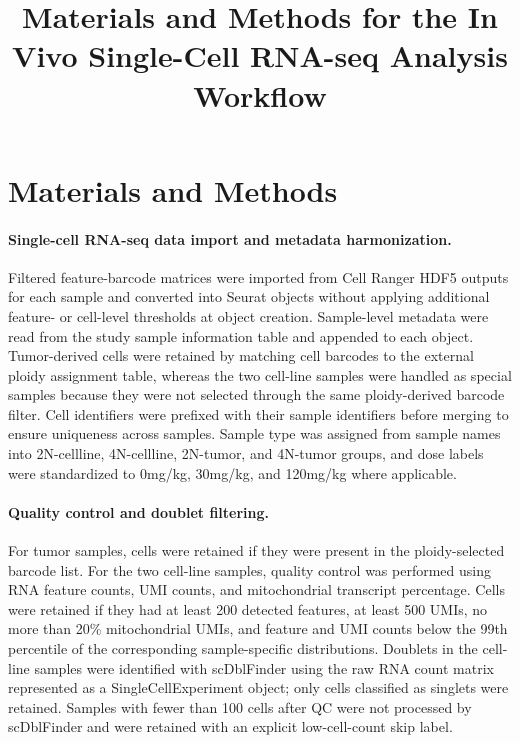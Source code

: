 \documentclass[11pt]{article}
\title{Materials and Methods for the In Vivo Single-Cell RNA-seq Analysis Workflow}
\author{}
\date{}
\begin{document}
\maketitle

\section*{Materials and Methods}

\paragraph{Single-cell RNA-seq data import and metadata harmonization.}
Filtered feature-barcode matrices were imported from Cell Ranger HDF5 outputs for each sample and converted into Seurat objects without applying additional feature- or cell-level thresholds at object creation. Sample-level metadata were read from the study sample information table and appended to each object. Tumor-derived cells were retained by matching cell barcodes to the external ploidy assignment table, whereas the two cell-line samples were handled as special samples because they were not selected through the same ploidy-derived barcode filter. Cell identifiers were prefixed with their sample identifiers before merging to ensure uniqueness across samples. Sample type was assigned from sample names into 2N-cellline, 4N-cellline, 2N-tumor, and 4N-tumor groups, and dose labels were standardized to 0mg/kg, 30mg/kg, and 120mg/kg where applicable.

\paragraph{Quality control and doublet filtering.}
For tumor samples, cells were retained if they were present in the ploidy-selected barcode list. For the two cell-line samples, quality control was performed using RNA feature counts, UMI counts, and mitochondrial transcript percentage. Cells were retained if they had at least 200 detected features, at least 500 UMIs, no more than 20\% mitochondrial UMIs, and feature and UMI counts below the 99th percentile of the corresponding sample-specific distributions. Doublets in the cell-line samples were identified with scDblFinder using the raw RNA count matrix represented as a SingleCellExperiment object; only cells classified as singlets were retained. Samples with fewer than 100 cells after QC were not processed by scDblFinder and were retained with an explicit low-cell-count skip label.
\end{document}
